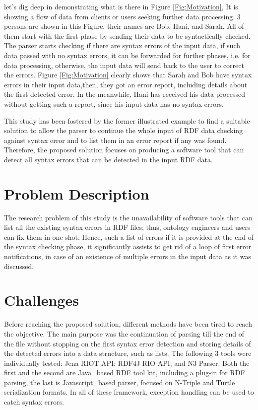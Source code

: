let's dig deep in demonstrating what is there in  {Figure \ref{Fig:Motivation}}, It is showing a flow of data from clients or users seeking further data processing. 3 persons are shown in this Figure, their names are Bob, Hani, and Sarah. All of them start with the first phase by sending their data to be syntactically checked. The parser starts checking if there are syntax errors of the input data, if such data passed with no syntax errors, it can be forwarded for further phases, i.e. for data processing, otherwise, the input data will send back to the user to correct the errors. {Figure \ref{Fig:Motivation}} clearly shows that Sarah and Bob have syntax errors in their input data,then, they got an error report, including details about the first detected error. In the meanwhile, Hani has received his data processed without getting such a report, since his input data has no syntax errors. 

This study has been fostered by the former illustrated example to find a suitable solution to allow the parser to continue the whole input of RDF data checking against syntax error and to list them in an error report if any was found. Therefore, the proposed solution focuses on producing a software tool that can detect all syntax errors that can be detected in the input RDF data. 

\section{Problem Description } 	
The research problem of this study is the unavailability of software tools that can list all the existing syntax errors in RDF files; thus, ontology engineers and users can fix them in one shot. Hence, such a list of errors if it is provided at the end of the syntax checking phase, it significantly assists to get rid of a loop of first error notifications, in case of an existence of multiple errors  in the input data as it was discussed.  

\section{Challenges }
Before reaching the proposed solution, different methods have been tired to reach the objective. The main purpose was the continuation of parsing till the end of the file without stopping on the first syntax error detection  and storing details of the detected errors into a data structure, such as lists. The following 3 tools were individually tested: Jena RIOT API\cite{McBride:2002:JSW:613357.613755}; RDF4J RIO API\cite{RDF4J:Online}; and  N3 Parser\cite{N3Parser:Online}. Both the first and the second are Java\_based RDF tool kit, including a plug-in for RDF parsing, the last is Javascript\_based parser, focused on N-Triple and Turtle serialization formats. In all of these framework, exception handling can be used to catch syntax errors. 


